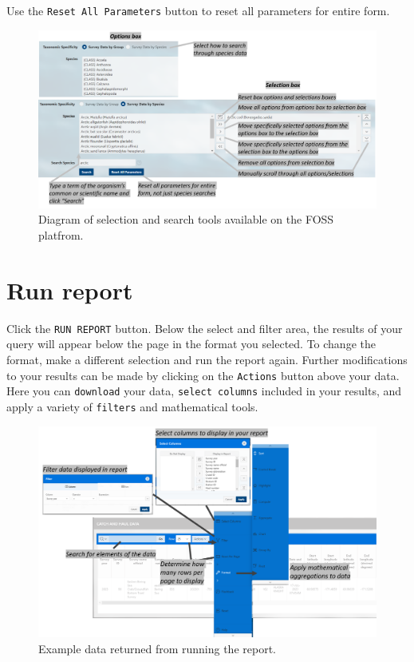 \documentclass[
  letterpaper,
  oneside,
  open=any]{scrbook}
\begin{document}
Use the \texttt{Reset\ All\ Parameters} button to reset all parameters
for entire form.

\begin{figure}

{\centering \includegraphics[width=6.72in,height=\textheight]{content/../img/foss_2_catch_select_species.png}

}

\caption{Diagram of selection and search tools available on the FOSS
platfrom.}

\end{figure}

\hypertarget{run-report}{%
\section{Run report}\label{run-report}}

Click the \texttt{RUN\ REPORT} button. Below the select and filter area,
the results of your query will appear below the page in the format you
selected. To change the format, make a different selection and run the
report again. Further modifications to your results can be made by
clicking on the \texttt{Actions} button above your data. Here you can
\texttt{download} your data, \texttt{select\ columns} included in your
results, and apply a variety of \texttt{filters} and mathematical tools.

\begin{figure}

{\centering \includegraphics[width=5.97in,height=\textheight]{content/../img/foss_3_run_report.png}

}

\caption{Example data returned from running the report.}

\end{figure}
\end{document}
